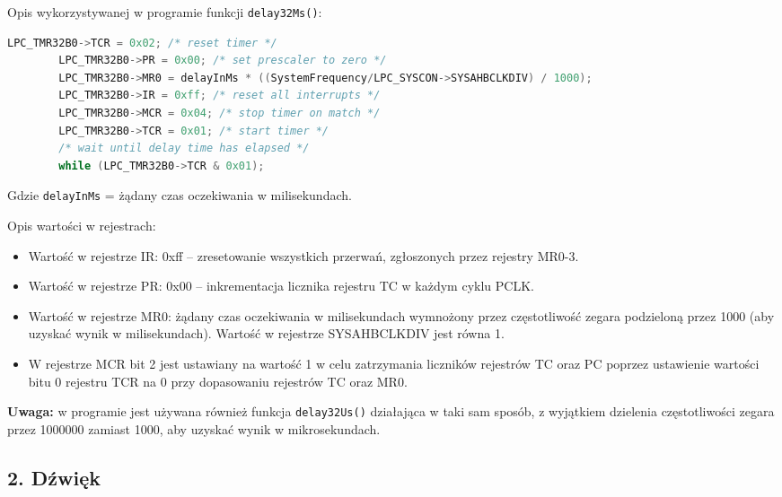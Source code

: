 \documentclass[a4paper,12pt]{report}
\begin{document}
Opis wykorzystywanej w programie funkcji \texttt{delay32Ms()}:\\
\begin{adjustbox}{width=\textwidth}
    \begin{lstlisting}[language=C]
        LPC_TMR32B0->TCR = 0x02; /* reset timer */
        LPC_TMR32B0->PR = 0x00; /* set prescaler to zero */
        LPC_TMR32B0->MR0 = delayInMs * ((SystemFrequency/LPC_SYSCON->SYSAHBCLKDIV) / 1000);
        LPC_TMR32B0->IR = 0xff; /* reset all interrupts */
        LPC_TMR32B0->MCR = 0x04; /* stop timer on match */
        LPC_TMR32B0->TCR = 0x01; /* start timer */
        /* wait until delay time has elapsed */
        while (LPC_TMR32B0->TCR & 0x01);
    \end{lstlisting}
\end{adjustbox}
\vspace{0.5em}

Gdzie \texttt{delayInMs} = żądany czas oczekiwania w milisekundach.

Opis wartości w rejestrach:
\begin{itemize}
    \item Wartość w rejestrze IR: 0xff – zresetowanie wszystkich przerwań, zgłoszonych przez rejestry MR0-3.
    \item Wartość w rejestrze PR: 0x00 – inkrementacja licznika rejestru TC w każdym cyklu PCLK.
    \item Wartość w rejestrze MR0: żądany czas oczekiwania w milisekundach wymnożony przez częstotliwość zegara podzieloną przez 1000 (aby uzyskać wynik w milisekundach). Wartość w rejestrze SYSAHBCLKDIV jest równa 1.
    \item W rejestrze MCR bit 2 jest ustawiany na wartość 1 w celu zatrzymania liczników rejestrów TC oraz PC poprzez ustawienie wartości bitu 0 rejestru TCR na 0 przy dopasowaniu rejestrów TC oraz MR0.
\end{itemize}

\textbf{Uwaga:} w programie jest używana również funkcja \texttt{delay32Us()} działająca w taki sam sposób, z wyjątkiem dzielenia częstotliwości zegara przez 1000000 zamiast 1000, aby uzyskać wynik w mikrosekundach.


\subsection*{2. Dźwięk}
\end{document}
